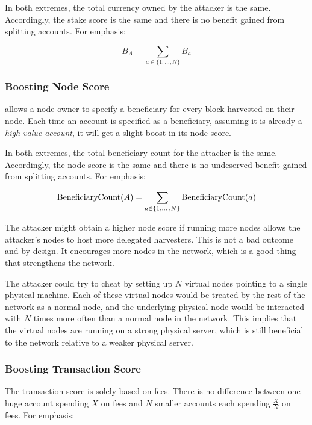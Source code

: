In both extremes, the total currency owned by the attacker is the same.
Accordingly, the stake score is the same and there is no benefit gained from splitting accounts.
For emphasis:

\begin{equation}
B_A = \sum\limits_{a \in \{1, \dotso, N\}} B_a
\end{equation}

\subsubsection*{Boosting Node Score}

\codenamespace allows a node owner to specify a beneficiary for every block harvested on their node.
Each time an account is specified as a beneficiary, assuming it is already a \emph{high value account}, it will get a slight boost in its node score.

In both extremes, the total beneficiary count for the attacker is the same.
Accordingly, the node score is the same and there is no undeserved benefit gained from splitting accounts.
For emphasis:

\begin{equation}
\operatorname{BeneficiaryCount}(A) = \sum\limits_{a \in \{1, \dotso, N\}} \operatorname{BeneficiaryCount}(a)
\end{equation}

The attacker might obtain a higher node score if running more nodes allows the attacker's nodes to host more delegated harvesters.
This is not a bad outcome and by design.
It encourages more nodes in the network, which is a good thing that strengthens the network.

The attacker could try to cheat by setting up $N$ virtual nodes pointing to a single physical machine.
Each of these virtual nodes would be treated by the rest of the network as a normal node, and the underlying physical node would be interacted with $N$ times more often than a normal node in the network.
This implies that the virtual nodes are running on a strong physical server, which is still beneficial to the network relative to a weaker physical server.

\subsubsection*{Boosting Transaction Score}

The transaction score is solely based on fees.
There is no difference between one huge account spending $X$ on fees and $N$ smaller accounts each spending $\frac{X}{N}$ on fees.
For emphasis:

